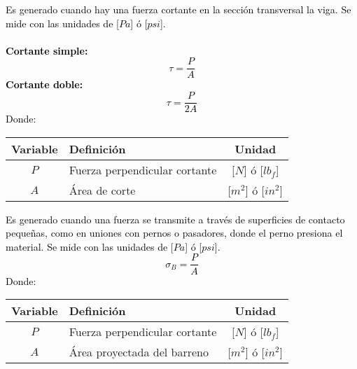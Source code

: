\documentclass[letterpaper,11pt]{extarticle}
\newcommand{\mybox}[2]
{
    \begin{tcolorbox}[colback=color!5!white,colframe=color!75!black,boxsep=1pt,arc=0pt,outer arc=0pt,title={\textcolor{white}{#1}}]
        \textcolor{black}{#2}
    \end{tcolorbox}
}
\begin{document}
\begin{multicols}{2}
        \mybox{Esfuerzo cortante:}
        {
            Es generado cuando hay una fuerza cortante en la sección transversal la viga. Se mide con las unidades de [$Pa$] ó [$psi$].\\\\
            \textbf{Cortante simple:}
            \begin{equation}
                \tau = \frac{P}{A}
            \end{equation}
            \textbf{Cortante doble:}
            \begin{equation}
                \tau = \frac{P}{2A}
            \end{equation}
            Donde:
            \begin{center}
                \begin{tabular}{ c | p{35mm} | c }
                    \hline Variable & Definición & Unidad \\ \hline 
                    $P$ & Fuerza perpendicular cortante & [$N$] ó [$lb_f$]\\
                    $A$ & Área de corte & [$m^2$] ó [$in^2$]\\ \hline
                \end{tabular}
            \end{center}
        }

        \mybox{Esfuerzo por aplastamiento:}
        {
            Es generado cuando una fuerza se transmite a través de superficies de contacto pequeñas, como en uniones con pernos o pasadores, donde el perno presiona el material. Se mide con las unidades de [$Pa$] ó [$psi$].
            \begin{equation}
                \sigma_B = \frac{P}{A}
            \end{equation}
            Donde:
            \begin{center}
                \begin{tabular}{ c | p{35mm} | c }
                    \hline Variable & Definición & Unidad \\ \hline 
                    $P$ & Fuerza perpendicular cortante & [$N$] ó [$lb_f$]\\
                    $A$ & Área proyectada del barreno & [$m^2$] ó [$in^2$]\\ \hline
                \end{tabular}
            \end{center}
        }
        

\end{multicols}
\end{document}
